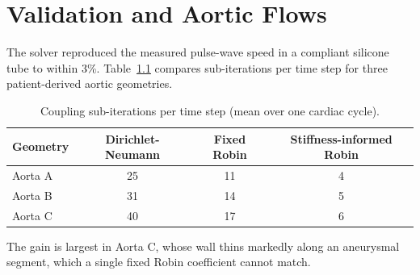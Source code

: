 \chapter{Validation and Aortic Flows}
\label{ch:results}

The solver reproduced the measured pulse-wave speed in a compliant silicone tube to within 3\%.
Table~\ref{tab:iters} compares sub-iterations per time step for three patient-derived aortic
geometries.

\begin{table}[htbp]
  \centering
  \caption{Coupling sub-iterations per time step (mean over one cardiac cycle).}
  \label{tab:iters}
  \begin{tabular}{lccc}
    \toprule
    Geometry & Dirichlet-Neumann & Fixed Robin & Stiffness-informed Robin \\
    \midrule
    Aorta A & 25 & 11 & 4 \\
    Aorta B & 31 & 14 & 5 \\
    Aorta C & 40 & 17 & 6 \\
    \bottomrule
  \end{tabular}
\end{table}

The gain is largest in Aorta C, whose wall thins markedly along an aneurysmal segment, which a
single fixed Robin coefficient cannot match.

